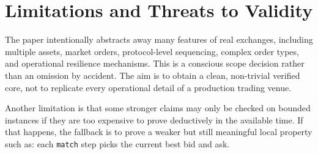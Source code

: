 \section{Limitations and Threats to Validity}

The paper intentionally abstracts away many features of real exchanges,
including multiple assets, market orders, protocol-level sequencing, complex
order types, and operational resilience mechanisms. This is a conscious scope
decision rather than an omission by accident. The aim is to obtain a clean,
non-trivial verified core, not to replicate every operational detail of a
production trading venue.

Another limitation is that some stronger claims may only be checked on bounded
instances if they are too expensive to prove deductively in the available time.
If that happens, the fallback is to prove a weaker but still meaningful local
property such as: each \texttt{match} step picks the current best bid and ask.
